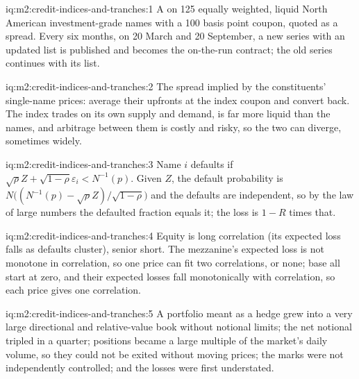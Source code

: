 \begin{solution}{iq:m2:credit-indices-and-tranches:1}
A  on 125 equally weighted, liquid North American investment-grade
names with a 100 basis point coupon, quoted as a spread. Every six months, on 20 March
and 20 September, a new series with an updated list is published and becomes the
on-the-run contract; the old series continues with its list.
\end{solution}

\begin{solution}{iq:m2:credit-indices-and-tranches:2}
The spread implied by the constituents' single-name prices: average their upfronts at
the index coupon and convert back. The index trades on its own supply and demand, is far
more liquid than the names, and arbitrage between them is costly and risky, so the two
can diverge, sometimes widely.
\end{solution}

\begin{solution}{iq:m2:credit-indices-and-tranches:3}
Name $i$ defaults if $\sqrt\rho Z + \sqrt{1-\rho}\varepsilon_i < N^{-1}(p)$. Given $Z$, the
default probability is $N\bigl((N^{-1}(p) - \sqrt\rho Z)/\sqrt{1-\rho}\bigr)$ and the
defaults are independent, so by the law of large numbers the defaulted fraction
equals it; the loss is $1-R$ times that.
\end{solution}

\begin{solution}{iq:m2:credit-indices-and-tranches:4}
Equity is long correlation (its expected loss falls as defaults cluster), senior
 short. The mezzanine's expected loss is not monotone in correlation, so one
price can fit two correlations, or none; base  all start at zero, and their
expected losses fall monotonically with correlation, so each price gives one
correlation.
\end{solution}

\begin{solution}{iq:m2:credit-indices-and-tranches:5}
A portfolio meant as a hedge grew into a very large directional and relative-value book
without notional limits; the net notional tripled in a quarter; positions became a large
multiple of the market's daily volume, so they could not be exited without moving
prices; the marks were not independently controlled; and the losses were first
understated.
\end{solution}

